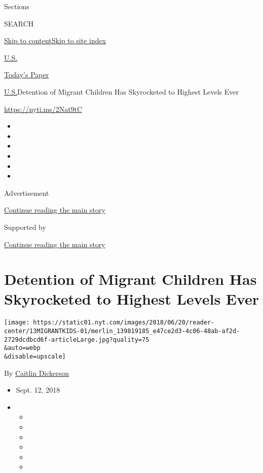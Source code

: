 Sections

SEARCH

\protect\hyperlink{site-content}{Skip to
content}\protect\hyperlink{site-index}{Skip to site index}

\href{https://www.nytimes.com/section/us}{U.S.}

\href{https://myaccount.nytimes.com/auth/login?response_type=cookie\&client_id=vi}{}

\href{https://www.nytimes.com/section/todayspaper}{Today's Paper}

\href{/section/us}{U.S.}\textbar{}Detention of Migrant Children Has
Skyrocketed to Highest Levels Ever

\href{https://nyti.ms/2Nat9tC}{https://nyti.ms/2Nat9tC}

\begin{itemize}
\item
\item
\item
\item
\item
\item
\end{itemize}

Advertisement

\protect\hyperlink{after-top}{Continue reading the main story}

Supported by

\protect\hyperlink{after-sponsor}{Continue reading the main story}

\hypertarget{detention-of-migrant-children-has-skyrocketed-to-highest-levels-ever}{%
\section{Detention of Migrant Children Has Skyrocketed to Highest Levels
Ever}\label{detention-of-migrant-children-has-skyrocketed-to-highest-levels-ever}}

\texttt{[image: https://static01.nyt.com/images/2018/06/20/reader-center/13MIGRANTKIDS-01/merlin\_139819185\_e47ce2d3-4c06-48ab-af2d-2729dcdbcd6f-articleLarge.jpg?quality=75\\\&auto=webp\\\&disable=upscale]}

By \href{https://www.nytimes.com/by/caitlin-dickerson}{Caitlin
Dickerson}

\begin{itemize}
\item
  Sept. 12, 2018
\item
  \begin{itemize}
  \item
  \item
  \item
  \item
  \item
  \item
  \end{itemize}
\end{itemize}

